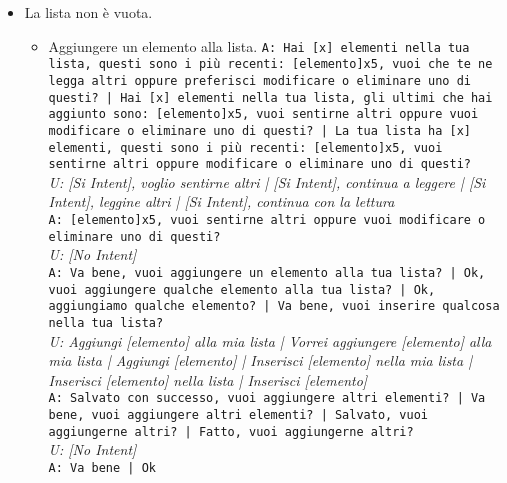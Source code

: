 \begin{itemize}
		\item La lista non è vuota.\\
		\begin{itemize}
			\item Aggiungere un elemento alla lista.
		\texttt{A: Hai [x] elementi nella tua lista, questi sono i più recenti: [elemento]x5, vuoi che te ne legga altri oppure preferisci modificare o eliminare uno di questi? | Hai [x] elementi nella tua lista, gli ultimi che hai aggiunto sono: [elemento]x5, vuoi sentirne altri oppure vuoi modificare o eliminare uno di questi? | La tua lista ha [x] elementi, questi sono i più recenti: [elemento]x5, vuoi sentirne altri oppure modificare o eliminare uno di questi? }\\
		\textit{U: [Si Intent], voglio sentirne altri | [Si Intent], continua a leggere | [Si Intent], leggine altri | [Si Intent], continua con la lettura }\\
		\texttt{A: [elemento]x5, vuoi sentirne altri oppure vuoi modificare o eliminare uno di questi? }\\
		\textit{U: [No Intent]}\\
		\texttt{A: Va bene, vuoi aggiungere un elemento alla tua lista? | Ok, vuoi aggiungere qualche elemento alla tua lista? | Ok, aggiungiamo qualche elemento? | Va bene, vuoi inserire qualcosa nella tua lista? }\\
		\textit{U: Aggiungi [elemento] alla mia lista | Vorrei aggiungere [elemento] alla mia lista | Aggiungi [elemento] | Inserisci [elemento] nella mia lista | Inserisci [elemento] nella lista  | Inserisci [elemento]}\\
		\texttt{A: Salvato con successo, vuoi aggiungere altri elementi? | Va bene, vuoi aggiungere altri elementi? | Salvato, vuoi aggiungerne altri? | Fatto, vuoi aggiungerne altri? }\\
		\textit{U: [No Intent]}\\
		\texttt{A: Va bene | Ok}
		

\end{itemize}
\end{itemize}
